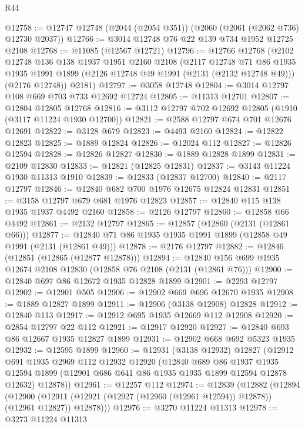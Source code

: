 \begin{lexlean}{R44}
\begin{coremodule}
@12758 := @12747 @12748 (@2044 (@2054 @351)) (@2060 (@2061 (@2062 @736) @12730 @2037))
@12766 := @3014 @12748 @76 @22 @139 @734 @1952 @12725 @2108
@12768 := @11085 (@12567 @12721)
@12796 := @12766
    @12768
    (@2102
      @12748
      @136
      @138
      @1937
      @1951
      @2160
      @2108
      (@2117
        @12748
        @71
        @86
        @1935
        @1935
        @1991
        @1899
        (@2126 @12748 @49 @1991 (@2131 (@2132 @12748 @49)))
        (@2176 @12748))
      @2181)
@12797 := @3058 @12748
@12804 := @3014 @12797 @108 @669 @703 @733 @12692 @12724
@12805 := @11313 @12701
@12807 := @12804 @12805 @12768
@12816 := @3112 @12797 @702 @12692 @12805 (@1910 (@3117 @11224 @1930 @12700))
@12821 := @2588 @12797 @674 @701 @12676 @12691
@12822 := @3128 @679
@12823 := @4493 @2160
@12824 := @12822 @12823
@12825 := @1889 @12824
@12826 := @12024 @112
@12827 := @12826 @12594
@12828 := @12826 @12827
@12830 := @1889 @12828 @1899
@12831 := @2109 @12830
@12833 := @12821 (@12825 @12831)
@12837 := @3143 @11224 @1930 @11313 @1910
@12839 := @12833 (@12837 @12700)
@12840 := @2117 @12797
@12846 := @12840 @682 @700 @1976 @12675 @12824 @12831
@12851 := @3158 @12797 @679 @681 @1976 @12823
@12857 := @12840 @115 @138 @1935 @1937 @4492 @2160
@12858 := @2126 @12797
@12860 := @12858 @66 @4492
@12861 := @2132 @12797
@12865 := @12857 (@12860 (@2131 (@12861 @66)))
@12877 := @12840 @71 @86 @1935 @1935 @1991 @1899 (@12858 @49 @1991 (@2131 (@12861 @49)))
@12878 := @2176 @12797
@12882 := @12846 (@12851 (@12865 (@12877 @12878)))
@12894 := @12840 @156 @699 @1935 @12674 @2108 @12830 (@12858 @76 @2108 (@2131 (@12861 @76)))
@12900 := @12840 @697 @86 @12672 @1935 @12828 @1899
@12901 := @2293 @12797
@12902 := @12901 @505
@12906 := @12902 @669 @696 @12670 @1935
@12908 := @1889 @12827 @1899
@12911 := @12906 (@3138 @12908) @12828
@12912 := @12840 @113
@12917 := @12912 @695 @1935 @12669 @112 @12908
@12920 := @2854 @12797 @22 @112
@12921 := @12917 @12920
@12927 := @12840 @693 @86 @12667 @1935 @12827 @1899
@12931 := @12902 @668 @692 @5323 @1935
@12932 := @12595 @1899
@12960 := @12931
    (@3138 @12932)
    @12827
    (@12912
      @691
      @1935
      @2969
      @112
      @12932
      @12920
      (@12840
        @689
        @86
        @1937
        @1935
        @12594
        @1899
        (@12901 @686 @641 @86 @1935 @1935 @1899 @12594 @12878 @12632)
        @12878))
@12961 := @12257 @112
@12974 := @12839
    (@12882
      (@12894
        (@12900 (@12911 (@12921 (@12927 (@12960 (@12961 @12594)) @12878)) (@12961 @12827)) @12878)))
@12976 := @3270 @11224 @11313
@12978 := @3273 @11224 @11313

\end{coremodule}
\end{lexlean}
